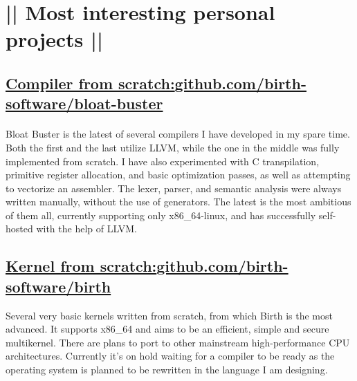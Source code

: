 \section*{|| Most interesting personal projects ||}
	\subsection*{\underline{Compiler from scratch:}\space \href{https://github.com/birth-software/bloat-buster}{\textbf{github.com/birth-software/bloat-buster}}}
	
	\paragraph{}Bloat Buster is the latest of several compilers I have developed in my spare time. Both the first and the last utilize LLVM, while the one in the middle was fully implemented from scratch. I have also experimented with C transpilation, primitive register allocation, and basic optimization passes, as well as attempting to vectorize an assembler. The lexer, parser, and semantic analysis were always written manually, without the use of generators. The latest is the most ambitious of them all, currently supporting only x86\_64-linux, and has successfully self-hosted with the help of LLVM.
	
	\subsection*{\underline{Kernel from scratch:}\space \href{https://github.com/birth-software/birth}{github.com/birth-software/birth}}
	Several very basic kernels written from scratch, from which Birth is the most advanced. It supports x86\_64 and aims to be an efficient, simple and secure multikernel. There are plans to port to other mainstream high-performance CPU architectures. Currently it's on hold waiting for a compiler to be ready as the operating system is planned to be rewritten in the language I am designing.